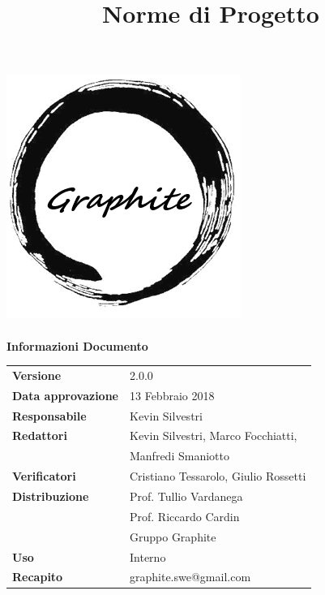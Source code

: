 \documentclass[openany,12pt,a4paper]{report}
\title{Norme di Progetto}
\author{}
\newcommand{\versione}{2.0.0}
\begin{document}
	\makeatletter
	\begin{titlepage}
		\setlength{\headsep}{0pt}  
		\begin{center}			
			\includegraphics[width=0.5\linewidth]{logo.png}\\[1em]
			{\huge \bfseries  \@title }\\[10ex]
			\textbf{\Large Informazioni Documento} \\[2em]
			\bgroup
			\def\arraystretch{1.5}
			\begin{tabular}{l|l}
				\textbf{Versione} & \versione{} \\
				\textbf{Data approvazione} & 13 Febbraio 2018 \\
				\textbf{Responsabile} & Kevin Silvestri \\
				\textbf{Redattori} & Kevin Silvestri, Marco Focchiatti,\\ 
				& Manfredi Smaniotto\\
				\textbf{Verificatori} & Cristiano Tessarolo, Giulio Rossetti \\
				\textbf{Distribuzione} & Prof. Tullio Vardanega \\
				 & Prof. Riccardo Cardin \\
				 & Gruppo Graphite \\
				\textbf{Uso} & Interno \\
				\textbf{Recapito} & graphite.swe@gmail.com \\
			\end{tabular}
		\egroup
		\end{center}
	\end{titlepage}
	\makeatother

	\thispagestyle{empty}
	\newpage
			
	
	
	\tableofcontents
	
	
	
	
	
	
	
	
	
\end{document}
